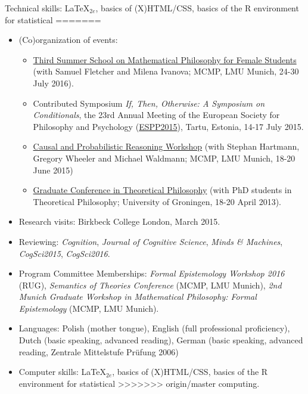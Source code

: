 \documentclass[11pt,article,oneside]{memoir}
\begin{document}
\begin{itemize}
\begin{itemize}
\ind Technical skills: \LaTeX$_{2e}$, basics of (X)HTML/CSS, basics of the R environment for statistical
=======
  \begin{itemize}
  	\item (Co)organization of events:
  		\begin{itemize}
		  \item \href{http://www.mathsummer.philosophie.uni-muenchen.de}{Third Summer School on Mathematical Philosophy for Female Students} (with Samuel Fletcher and Milena Ivanova; MCMP, LMU Munich, 24-30 July 2016).
		  \item Contributed Symposium \emph{If, Then, Otherwise: A Symposium on Conditionals}, the 23rd Annual Meeting of the European Society for Philosophy and Psychology (\href{http://espp2015.ut.ee}{ESPP2015}), Tartu, Estonia, 14-17 July 2015.
		  \item \href{http://lmu.de/cpr2015}{Causal and Probabilistic Reasoning Workshop} (with Stephan Hartmann, Gregory Wheeler and Michael Waldmann; MCMP, LMU Munich, 18-20 June 2015)
		  \item  \href{http://www.philos.rug.nl/GCTP2013/}{Graduate Conference in
	      Theoretical Philosophy} (with PhD students in Theoretical Philosophy; University of Groningen, 18-20 April 2013).
  		\end{itemize}
  	\item Research visits: Birkbeck College London, March 2015.

    \item Reviewing: \emph{Cognition}, \emph{Journal of Cognitive Science}, \emph{Minds \& Machines}, \emph{CogSci2015}, \emph{CogSci2016}.
    
    \item Program Committee Memberships: \emph{Formal Epistemology Workshop 2016} (RUG), \emph{Semantics of Theories Conference} (MCMP, LMU Munich), \emph{2nd Munich Graduate Workshop in Mathematical Philosophy: Formal Epistemology} (MCMP, LMU Munich).
  \end{itemize}



  \begin{itemize}
  \item Languages: Polish (mother tongue), English (full professional proficiency), Dutch
    (basic speaking, advanced reading), German (basic speaking, advanced reading, Zentrale
    Mittelstufe Pr\"ufung 2006)
  \item Computer skills: \LaTeX$_{2e}$, basics of
    (X)HTML/CSS, basics of the R environment for statistical
>>>>>>> origin/master
    computing.


\end{itemize}
\end{itemize}
\end{itemize}
\end{document}
